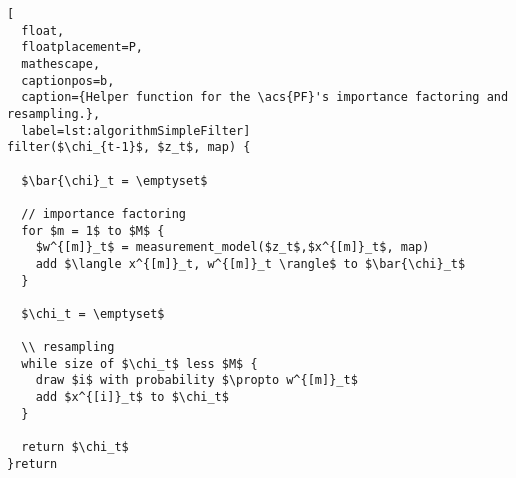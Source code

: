 \begin{lstlisting}[
  float,
  floatplacement=P,
  mathescape,
  captionpos=b,
  caption={Helper function for the \acs{PF}'s importance factoring and resampling.},
  label=lst:algorithmSimpleFilter]
filter($\chi_{t-1}$, $z_t$, map) {

  $\bar{\chi}_t = \emptyset$

  // importance factoring
  for $m = 1$ to $M$ {
    $w^{[m]}_t$ = measurement_model($z_t$,$x^{[m]}_t$, map)
    add $\langle x^{[m]}_t, w^{[m]}_t \rangle$ to $\bar{\chi}_t$
  }

  $\chi_t = \emptyset$

  \\ resampling
  while size of $\chi_t$ less $M$ {
    draw $i$ with probability $\propto w^{[m]}_t$
    add $x^{[i]}_t$ to $\chi_t$
  }

  return $\chi_t$
}return\end{lstlisting}

